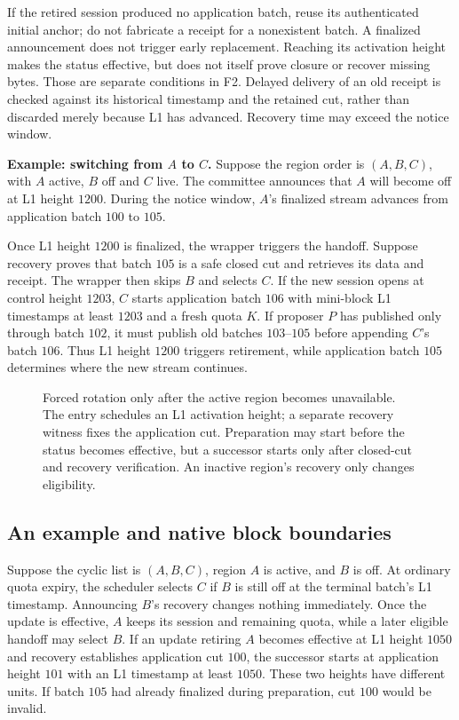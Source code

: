\documentclass[11pt,a4paper,onecolumn]{article}
\begin{document}
If the retired session produced no application batch, reuse its authenticated
initial anchor; do not fabricate a receipt for a nonexistent batch.
A finalized announcement does not trigger early replacement. Reaching its
activation height makes the status effective, but does not itself prove
closure or recover missing bytes. Those are separate conditions in F2.
Delayed delivery of an old receipt is checked against its historical
timestamp and the retained cut, rather than discarded merely because L1
has advanced. Recovery time may exceed the notice window.

\smallskip
{}
\noindent\textbf{Example: switching from $A$ to $C$.}
Suppose the region order is $(A,B,C)$, with $A$ active, $B$ off and $C$
live. The committee announces that $A$ will become off at L1 height
$1200$. During the notice window, $A$'s finalized stream advances from
application batch $100$ to $105$.

Once L1 height $1200$ is finalized, the wrapper triggers the handoff.
Suppose recovery proves that batch $105$ is a safe closed cut and retrieves
its data and receipt. The wrapper then skips $B$ and selects $C$.
If the new session opens at control height $1203$, $C$ starts application
batch $106$ with mini-block L1 timestamps at least $1203$ and a fresh quota
$K$. If proposer $P$ has published only through batch $102$, it must publish
old batches $103$--$105$ before appending $C$'s batch $106$.
Thus L1 height $1200$ triggers retirement, while application batch $105$
determines where the new stream continues.

\begin{figure}[H]\centering

\caption{Forced rotation only after the active region becomes unavailable.
The entry schedules an L1 activation height; a separate recovery witness
fixes the application cut. Preparation may start before the status becomes
effective, but a successor starts only after closed-cut and recovery
verification. An inactive region's recovery only changes eligibility.}
\label{fig:forced}
\end{figure}
\FloatBarrier

\subsection{An example and native block boundaries}
Suppose the cyclic list is $(A,B,C)$, region $A$ is active, and $B$ is off.
At ordinary quota expiry, the scheduler selects $C$ if $B$ is still off
at the terminal batch's L1 timestamp. Announcing $B$'s recovery changes
nothing immediately. Once the update is effective, $A$ keeps its session
and remaining quota, while a later eligible handoff may select $B$.
If an update retiring $A$ becomes effective at L1 height $1050$ and
recovery establishes application cut $100$, the successor starts at
application height $101$ with an L1 timestamp at least $1050$.
These two heights have different units. If batch $105$ had already
finalized during preparation, cut $100$ would be invalid.
\end{document}
